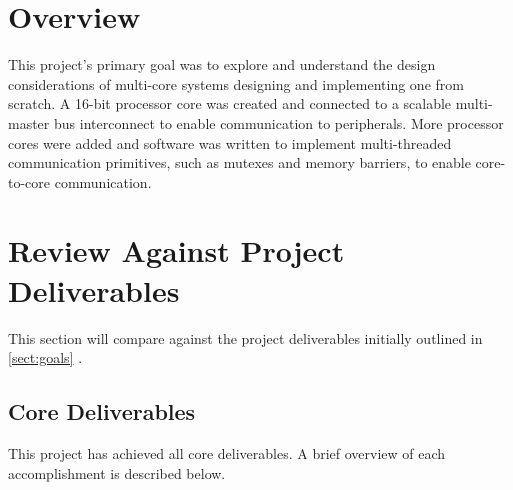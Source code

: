 \section{Overview}
This project's primary goal was to explore and understand the design considerations of multi-core systems designing and implementing one from scratch. A 16-bit processor core was created and connected to a scalable multi-master bus interconnect to enable communication to peripherals. More processor cores were added and software was written to implement multi-threaded communication primitives, such as mutexes and memory barriers, to enable core-to-core communication.

\section{Review Against Project Deliverables}
This section will compare against the project deliverables initially outlined in \cref{sect:goals} .
\subsection{Core Deliverables}
This project has achieved all core deliverables. A brief overview of each accomplishment is described below.

